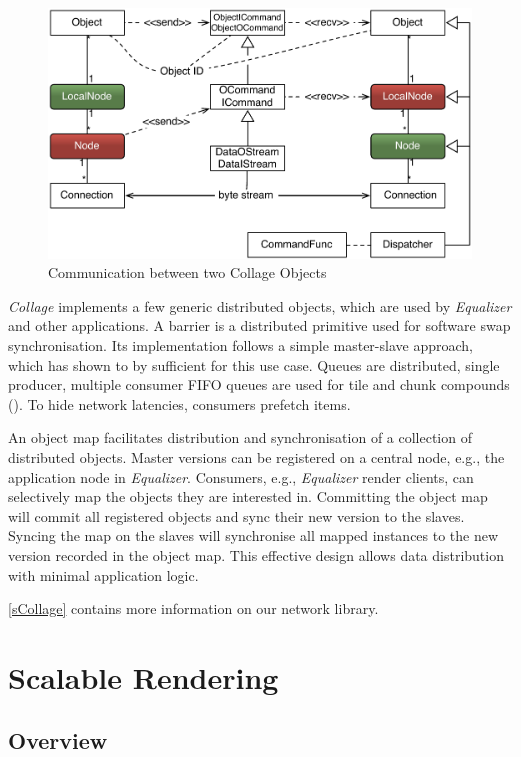 \begin{figure}[ht]\center
  \includegraphics[width=\columnwidth]{images/netObject}
  \caption{\label{fNetObject}Communication between two Collage Objects}
\end{figure}

{\em Collage} implements a few generic distributed objects, which are used by
{\em Equalizer} and other applications. A barrier is a distributed primitive
used for software swap synchronisation. Its implementation follows a simple
master-slave approach, which has shown to by sufficient for this use case.
Queues are distributed, single producer, multiple consumer FIFO queues are used for
tile and chunk compounds (). To hide network latencies, consumers
prefetch items.

An object map facilitates distribution and synchronisation of a collection of
distributed objects. Master versions can be registered on a central node, e.g.,
the application node in {\em Equalizer}. Consumers, e.g., {\em Equalizer}
render clients, can selectively map the objects they are interested in.
Committing the object map will commit all registered objects and sync their new
version to the slaves. Syncing the map on the slaves will synchronise all mapped
instances to the new version recorded in the object map. This effective design
allows data distribution with minimal application logic.

\cref{sCollage} contains more information on our network library.

\chapter{Scalable Rendering}\label{sScalable}

\section{Overview}

